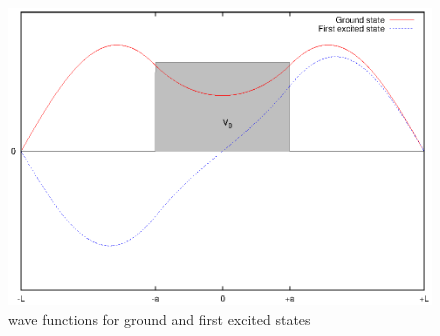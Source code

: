 \documentclass{article}
\begin{document}
\begin{figure}
\centering
\includegraphics{ex_1_3_psi.eps}
\caption{wave functions for ground and first excited states}
\label{ex_1_3_psi}
\end{figure}
\end{document}
